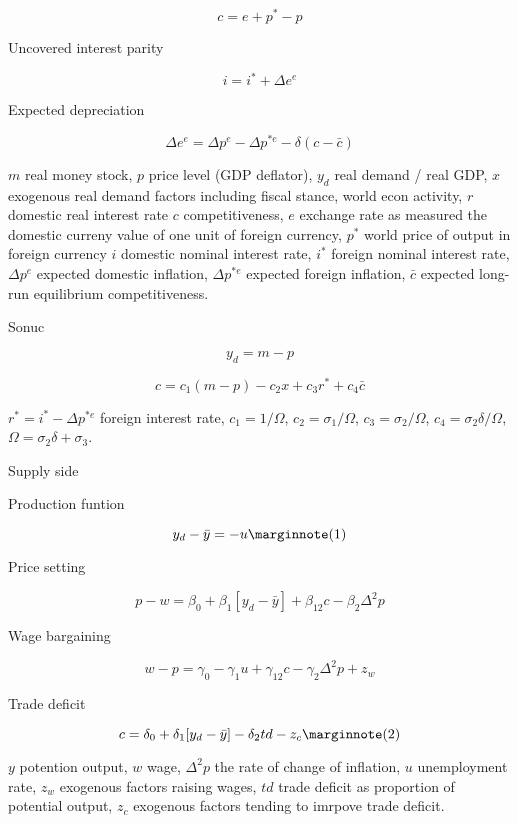 \documentclass[12pt,fleqn]{article}\usepackage{../../common}
\begin{document}
%
$$ c = e + p^* - p $$

Uncovered interest parity

%
$$ i = i^* + \Delta e^e $$

Expected depreciation

%
$$ \Delta e^e = \Delta p^e - \Delta p^{*e} - \delta (c - \bar{c}) $$


$m$ real money stock, $p$ price level (GDP deflator), $y_d$ real demand / real
GDP, $x$ exogenous real demand factors including fiscal stance, world econ
activity, $r$ domestic real interest rate $c$ competitiveness, $e$ exchange rate
as measured the domestic curreny value of one unit of foreign currency, $p^*$
world price of output in foreign currency $i$ domestic nominal interest rate,
$i^*$ foreign nominal interest rate, $\Delta p^e$ expected domestic inflation,
$\Delta p^{*e}$  expected foreign inflation, $\bar{c}$ expected long-run
equilibrium competitiveness.

Sonuc

%
$$ y_d = m - p $$

%
$$ c = c_1 (m-p) - c_2 x + c_3 r^* + c_4 \bar{c} $$

$r^* = i^* - \Delta p^{*e}$ foreign interest rate, $c_1 = 1/\Omega$, $c_2 =
\sigma_1 / \Omega$, $c_3 = \sigma_2 / \Omega$, $c_4 = \sigma_2 \delta / \Omega$,
$\Omega = \sigma_2 \delta + \sigma_3 $. 

Supply side

Production funtion

%
$$ y_d - \bar{y} = -u \mlabel{1} $$

Price setting

%
$$ p - w = \beta_0 + \beta_1 [y_d - \bar{y} ] + \beta_{12}c - \beta_2 \Delta^2 p $$

Wage bargaining

%
$$ w - p = \gamma_0 - \gamma_1 u + \gamma_{12}c - \gamma_2 \Delta^2 p + z_w $$

Trade deficit

%
$$ c = \delta_0 + \delta_1 [y_d - \bar{y} ] - \delta_2 td - z_c
\mlabel{2}
$$

$y$ potention output, $w$ wage, $\Delta^2 p$ the rate of change of inflation,
$u$ unemployment rate, $z_w$ exogenous factors raising wages, $td$ trade deficit
as proportion of potential output, $z_c$ exogenous factors tending to imrpove
trade deficit. 
\end{document}
